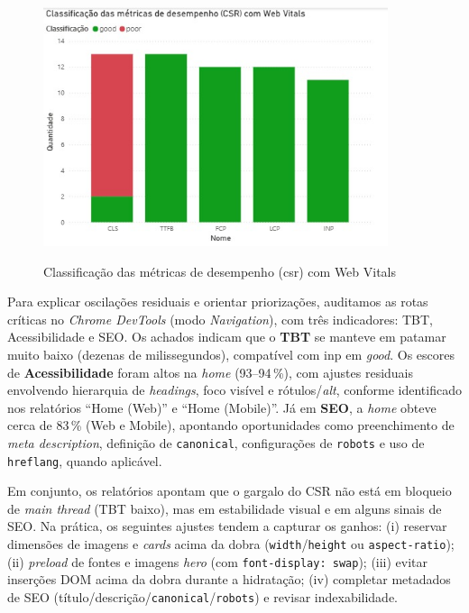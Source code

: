 {\begin{figure}[H]
\centering
\caption{Classificação das métricas de desempenho (\acrshort{csr}) com Web Vitals}
\includegraphics[width=0.9\textwidth]{media/metricas_csr_web_vitals.jpeg}
\label{fig:csr-webvitals}
\end{figure}

Para explicar oscilações residuais e orientar priorizações, auditamos as rotas críticas no \emph{Chrome DevTools} (modo \emph{Navigation}), com três indicadores: TBT, Acessibilidade e SEO. Os achados indicam que o \textbf{TBT} se manteve em patamar muito baixo (dezenas de milissegundos), compatível com \acrshort{inp} em \textit{good}. Os escores de \textbf{Acessibilidade} foram altos na \emph{home} (93--94\,\%), com ajustes residuais envolvendo hierarquia de \emph{headings}, foco visível e rótulos/\textit{alt}, conforme identificado nos relatórios “Home (Web)” e “Home (Mobile)”. Já em \textbf{SEO}, a \emph{home} obteve cerca de 83\,\% (Web e Mobile), apontando oportunidades como preenchimento de \emph{meta description}, definição de \texttt{canonical}, configurações de \texttt{robots} e uso de \texttt{hreflang}, quando aplicável.

Em conjunto, os relatórios apontam que o gargalo do CSR não está em bloqueio de \emph{main thread} (TBT baixo), mas em estabilidade visual e em alguns sinais de SEO. Na prática, os seguintes ajustes tendem a capturar os ganhos: (i) reservar dimensões de imagens e \emph{cards} acima da dobra (\texttt{width}/\texttt{height} ou \texttt{aspect-ratio}); (ii) \emph{preload} de fontes e imagens \emph{hero} (com \texttt{font-display: swap}); (iii) evitar inserções DOM acima da dobra durante a hidratação; (iv) completar metadados de SEO (título/descrição/\texttt{canonical}/\texttt{robots}) e revisar indexabilidade.

}
